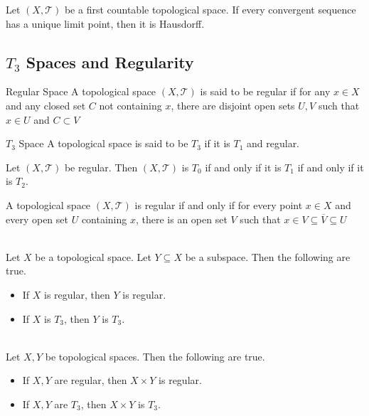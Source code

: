 \documentclass[a4paper]{article}
\begin{document}
\begin{prp}{}{} Let $(X,\mathcal{T})$ be a first countable topological space. If every convergent sequence has a unique limit point, then it is Hausdorff. 
\end{prp}

\subsection{$T_3$ Spaces and Regularity}
\begin{defn}{Regular Space}{} A topological space $(X,\mathcal{T})$ is said to be regular if for any $x\in X$ and any closed set $C$ not containing $x$, there are disjoint open sets $U,V$ such that $x\in U$ and $C\subset V$
\end{defn}

\begin{defn}{$T_3$ Space}{} A topological space is said to be $T_3$ if it is $T_1$ and regular. 
\end{defn}

\begin{prp}{}{} Let $(X,\mathcal{T})$ be regular. Then $(X,\mathcal{T})$ is $T_0$ if and only if it is $T_1$ if and only if it is $T_2$. 
\end{prp}

\begin{prp}{}{} A topological space $(X,\mathcal{T})$ is regular if and only if for every point $x\in X$ and every open set $U$ containing $x$, there is an open set $V$ such that $x\in V\subseteq\overline{V}\subseteq U$
\end{prp}

\begin{prp}{}{}\\
Let $X$ be a topological space. Let $Y\subseteq X$ be a subspace. Then the following are true. 
\begin{itemize}
\item If $X$ is regular, then $Y$ is regular. 
\item If $X$ is $T_3$, then $Y$ is $T_3$. 
\end{itemize}
\end{prp}

\begin{prp}{}{}\\
Let $X,Y$ be topological spaces. Then the following are true. 
\begin{itemize}
\item If $X,Y$ are regular, then $X\times Y$ is regular. 
\item If $X,Y$ are $T_3$, then $X\times Y$ is $T_3$. 
\end{itemize}
\end{prp}
\end{document}
